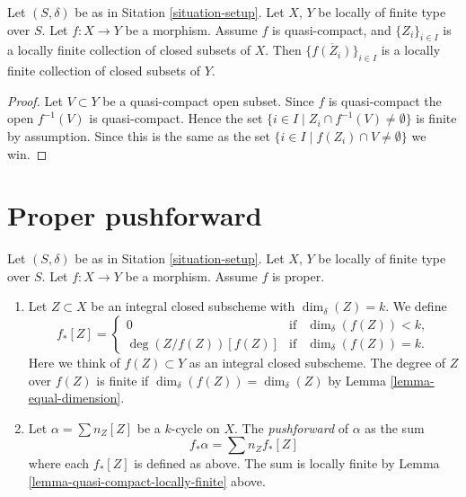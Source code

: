 \begin{lemma}
\label{lemma-quasi-compact-locally-finite}
Let $(S, \delta)$ be as in Sitation \ref{situation-setup}.
Let $X$, $Y$ be locally of finite type over $S$.
Let $f : X \to Y$ be a morphism.
Assume $f$ is quasi-compact, and $\{Z_i\}_{i \in I}$ is a locally
finite collection of closed subsets of $X$.
Then $\{\overline{f(Z_i)}\}_{i \in I}$ is a locally finite
collection of closed subsets of $Y$.
\end{lemma}

\begin{proof}
Let $V \subset Y$ be a quasi-compact open subset.
Since $f$ is quasi-compact the open $f^{-1}(V)$ is
quasi-compact. Hence the set
$\{i \in I \mid Z_i \cap f^{-1}(V) \not = \emptyset \}$
is finite by assumption. Since this is the same
as the set
$\{i \in I \mid f(Z_i) \cap V \not = \emptyset \}$
we win.
\end{proof}









\section{Proper pushforward}
\label{section-proper-pushforward}

\begin{definition}
\label{definition-proper-pushforward}
Let $(S, \delta)$ be as in Sitation \ref{situation-setup}.
Let $X$, $Y$ be locally of finite type over $S$.
Let $f : X \to Y$ be a morphism.
Assume $f$ is proper.
\begin{enumerate}
\item Let $Z \subset X$ be an integral closed subscheme
with $\dim_\delta(Z) = k$. We define
$$
f_*[Z] =
\left\{
\begin{matrix}
0 & \text{if} & \dim_\delta(f(Z))< k, \\
\deg(Z/f(Z)) [f(Z)] & \text{if} & \dim_\delta(f(Z)) = k.
\end{matrix}
\right.
$$
Here we think of $f(Z) \subset Y$ as an integral closed subscheme.
The degree of $Z$ over $f(Z)$ is finite if
$\dim_\delta(f(Z)) = \dim_\delta(Z)$
by Lemma \ref{lemma-equal-dimension}.
\item Let $\alpha = \sum n_Z [Z]$ be a $k$-cycle on $X$. The
{\it pushforward} of $\alpha$ as the sum
$$
f_* \alpha = \sum n_Z f_*[Z]
$$
where each $f_*[Z]$ is defined as above. The sum is locally finite
by Lemma \ref{lemma-quasi-compact-locally-finite} above.
\end{enumerate}
\end{definition}

